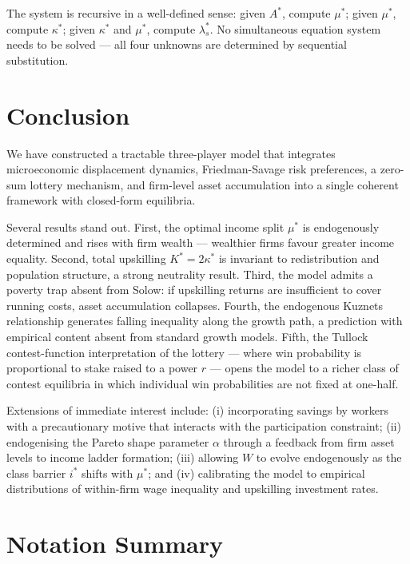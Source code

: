 \documentclass[12pt,a4paper]{article}
\begin{document}
The system is recursive in a well-defined sense: given $A^*$, compute
$\mu^*$; given $\mu^*$, compute $\kappa^*$; given $\kappa^*$ and $\mu^*$,
compute $\lambda_s^*$. No simultaneous equation system needs to be solved
— all four unknowns are determined by sequential substitution.

\section{Conclusion}

We have constructed a tractable three-player model that integrates
microeconomic displacement dynamics, Friedman-Savage risk preferences,
a zero-sum lottery mechanism, and firm-level asset accumulation into
a single coherent framework with closed-form equilibria.

Several results stand out. First, the optimal income split
$\mu^*$ is endogenously determined and rises with firm wealth —
wealthier firms favour greater income equality. Second, total
upskilling $K^* = 2\kappa^*$ is invariant to redistribution and
population structure, a strong neutrality result. Third, the model
admits a poverty trap absent from Solow: if upskilling returns
are insufficient to cover running costs, asset accumulation
collapses. Fourth, the endogenous Kuznets relationship generates
falling inequality along the growth path, a prediction with
empirical content absent from standard growth models. Fifth,
the Tullock contest-function interpretation of the lottery — where
win probability is proportional to stake raised to a power $r$ — opens
the model to a richer class of contest equilibria in which individual
win probabilities are not fixed at one-half.

Extensions of immediate interest include: (i) incorporating savings
by workers with a precautionary motive that interacts with the
participation constraint; (ii) endogenising the Pareto shape parameter
$\alpha$ through a feedback from firm asset levels to income ladder
formation; (iii) allowing $W$ to evolve endogenously as the class
barrier $i^*$ shifts with $\mu^*$; and (iv) calibrating the model to
empirical distributions of within-firm wage inequality and upskilling
investment rates.

\appendix
\section{Notation Summary}
\end{document}
